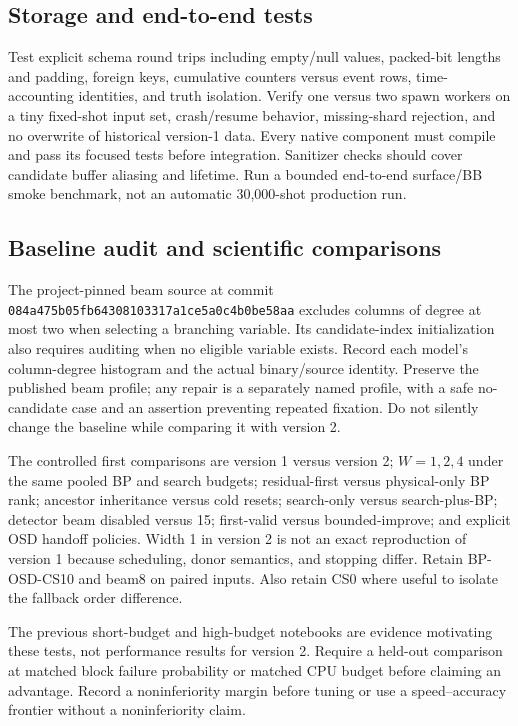 \documentclass[11pt,a4paper]{article}
\newcommand{\code}[1]{\nolinkurl{#1}}
\begin{document}
\subsection{Storage and end-to-end tests}
Test explicit schema round trips including empty/null values, packed-bit lengths and padding, foreign keys, cumulative counters versus event rows, time-accounting identities, and truth isolation. Verify one versus two spawn workers on a tiny fixed-shot input set, crash/resume behavior, missing-shard rejection, and no overwrite of historical version-1 data. Every native component must compile and pass its focused tests before integration. Sanitizer checks should cover candidate buffer aliasing and lifetime. Run a bounded end-to-end surface/BB smoke benchmark, not an automatic 30,000-shot production run.

\subsection{Baseline audit and scientific comparisons}
The project-pinned beam source at commit \code{084a475b05fb64308103317a1ce5a0c4b0be58aa} excludes columns of degree at most two when selecting a branching variable. Its candidate-index initialization also requires auditing when no eligible variable exists. Record each model's column-degree histogram and the actual binary/source identity. Preserve the published beam profile; any repair is a separately named profile, with a safe no-candidate case and an assertion preventing repeated fixation. Do not silently change the baseline while comparing it with version 2.

The controlled first comparisons are version 1 versus version 2; $W=1,2,4$ under the same pooled BP and search budgets; residual-first versus physical-only BP rank; ancestor inheritance versus cold resets; search-only versus search-plus-BP; detector beam disabled versus 15; first-valid versus bounded-improve; and explicit OSD handoff policies. Width 1 in version 2 is not an exact reproduction of version 1 because scheduling, donor semantics, and stopping differ. Retain BP-OSD-CS10 and beam8 on paired inputs. Also retain CS0 where useful to isolate the fallback order difference.

The previous short-budget and high-budget notebooks are evidence motivating these tests, not performance results for version 2. Require a held-out comparison at matched block failure probability or matched CPU budget before claiming an advantage. Record a noninferiority margin before tuning or use a speed--accuracy frontier without a noninferiority claim.
\end{document}
